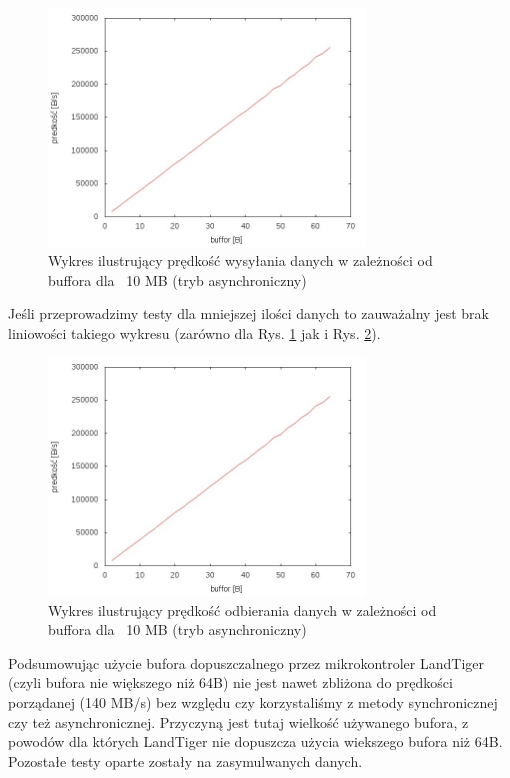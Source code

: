 \documentclass{BscUS}
\begin{document}

\begin{figure}[H]
{
\centering
\includegraphics[width=0.75\textwidth]{./img/A_10737420Send}
\caption{Wykres ilustrujący prędkość wysyłania danych w zależności od buffora dla ~10 MB (tryb asynchroniczny)}
\label{fig:A_10737420Send}
}
\end{figure}

\noindent Jeśli przeprowadzimy testy dla mniejszej ilości danych to zauważalny jest brak liniowości takiego wykresu (zarówno dla Rys. \ref{fig:A_10737420Send} jak i Rys. \ref{fig:A_10737420Receive}).
\begin{figure}[H]
{
\centering
\includegraphics[width=0.75\textwidth]{./img/A_10737420Receive}
\caption{Wykres ilustrujący prędkość odbierania danych w zależności od buffora dla ~10 MB (tryb asynchroniczny)}
\label{fig:A_10737420Receive}
}
\end{figure}

\indent Podsumowując użycie bufora dopuszczalnego przez mikrokontroler LandTiger (czyli bufora nie większego niż 64B) nie jest nawet zbliżona do prędkości porządanej (140 MB/s) bez względu czy korzystaliśmy z metody synchronicznej czy też asynchronicznej. Przyczyną jest tutaj wielkość używanego bufora, z powodów dla których LandTiger nie dopuszcza użycia wiekszego bufora niż 64B. Pozostałe testy oparte zostały na zasymulwanych danych. 
\newline
\end{document}
